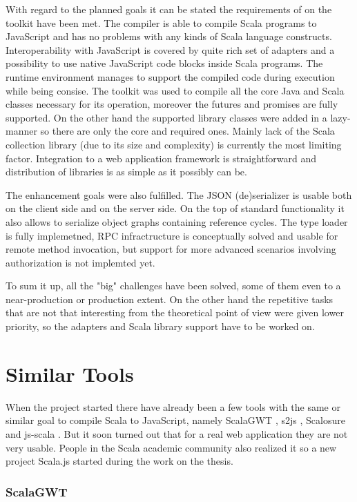 \documentclass[12pt,a4paper]{report}
\begin{document}
With regard to the planned goals it can be stated the requirements of on the toolkit have been met. The compiler is able to compile Scala programs to JavaScript and has no problems with any kinds of Scala language constructs. Interoperability with JavaScript is covered by quite rich set of adapters and a possibility to use native JavaScript code blocks inside Scala programs. The runtime environment manages to support the compiled code during execution while being consise. The toolkit was used to compile all the core Java and Scala classes necessary for its operation, moreover the futures and promises are fully supported. On the other hand the supported library classes were added in a lazy-manner so there are only the core and required ones. Mainly lack of the Scala collection library (due to its size and complexity) is currently the most limiting factor. Integration to a web application framework is straightforward and distribution of libraries is as simple as it possibly can be.

The enhancement goals were also fulfilled. The JSON (de)serializer is usable both on the client side and on the server side. On the top of standard functionality it also allows to serialize object graphs containing reference cycles. The type loader is fully implemetned, RPC infractructure is conceptually solved and usable for remote method invocation, but support for more advanced scenarios involving authorization is not implemted yet.

To sum it up, all the "big" challenges have been solved, some of them even to a near-production or production extent. On the other hand the repetitive tasks that are not that interesting from the theoretical point of view were given lower priority, so the adapters and Scala library support have to be worked on.

\section{Similar Tools}

When the project started there have already been a few tools with the same or similar goal to compile Scala to JavaScript, namely ScalaGWT \cite{ScalaGwt}, s2js \cite{S2js}, Scalosure \cite{Scalosure} and js-scala  \cite{JsScala}. But it soon turned out that for a real web application they are not very usable. People in the Scala academic community also realized it so a new project Scala.js \cite{ScalaJs} started during the work on the thesis.

\subsubsection*{ScalaGWT}
\end{document}
